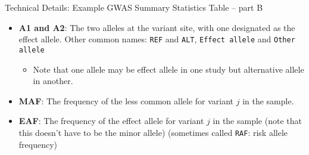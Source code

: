 \begin{frame}{Technical Details: Example GWAS Summary Statistics Table -- part B}

\begin{table}[h]
\centering
{}
\end{table}

\begin{itemize}
\item \textbf{A1 and A2}: The two alleles at the variant site, with one designated as the effect allele. Other common names: \texttt{REF} and \texttt{ALT}, \texttt{Effect allele} and \texttt{Other allele}
\begin{itemize}
\item Note that one allele may be effect allele in one study but alternative allele in another.
\end{itemize}
\item \textbf{MAF}: The frequency of the less common allele for variant $j$ in the sample.
\item \textbf{EAF}: The frequency of the effect allele for variant $j$ in the sample (note that this doesn't have to be the minor allele) (sometimes called \texttt{RAF}: risk allele frequency)
\end{itemize}

\end{frame}


